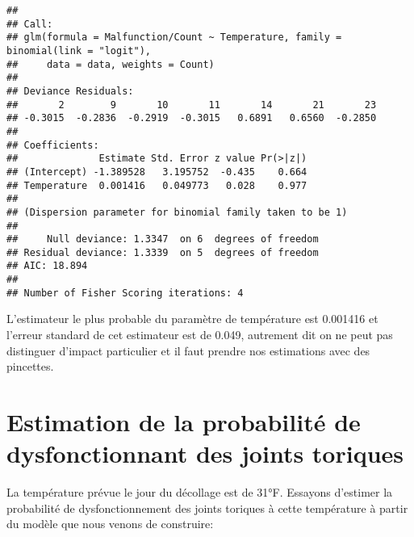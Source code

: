 \documentclass[]{article}
\newenvironment{Shaded}{\begin{snugshade}}{\end{snugshade}}
\newcommand{\CommentTok}[1]{\textcolor[rgb]{0.56,0.35,0.01}{\textit{#1}}}
\newcommand{\DataTypeTok}[1]{\textcolor[rgb]{0.13,0.29,0.53}{#1}}
\newcommand{\DecValTok}[1]{\textcolor[rgb]{0.00,0.00,0.81}{#1}}
\newcommand{\FloatTok}[1]{\textcolor[rgb]{0.00,0.00,0.81}{#1}}
\newcommand{\KeywordTok}[1]{\textcolor[rgb]{0.13,0.29,0.53}{\textbf{#1}}}
\newcommand{\NormalTok}[1]{#1}
\newcommand{\OperatorTok}[1]{\textcolor[rgb]{0.81,0.36,0.00}{\textbf{#1}}}
\newcommand{\StringTok}[1]{\textcolor[rgb]{0.31,0.60,0.02}{#1}}
\begin{document}
\begin{verbatim}
## 
## Call:
## glm(formula = Malfunction/Count ~ Temperature, family = binomial(link = "logit"), 
##     data = data, weights = Count)
## 
## Deviance Residuals: 
##       2        9       10       11       14       21       23  
## -0.3015  -0.2836  -0.2919  -0.3015   0.6891   0.6560  -0.2850  
## 
## Coefficients:
##              Estimate Std. Error z value Pr(>|z|)
## (Intercept) -1.389528   3.195752  -0.435    0.664
## Temperature  0.001416   0.049773   0.028    0.977
## 
## (Dispersion parameter for binomial family taken to be 1)
## 
##     Null deviance: 1.3347  on 6  degrees of freedom
## Residual deviance: 1.3339  on 5  degrees of freedom
## AIC: 18.894
## 
## Number of Fisher Scoring iterations: 4
\end{verbatim}

L'estimateur le plus probable du paramètre de température est 0.001416
et l'erreur standard de cet estimateur est de 0.049, autrement dit on ne
peut pas distinguer d'impact particulier et il faut prendre nos
estimations avec des pincettes.

\hypertarget{estimation-de-la-probabilite-de-dysfonctionnant-des-joints-toriques}{%
\section{Estimation de la probabilité de dysfonctionnant des joints
toriques}\label{estimation-de-la-probabilite-de-dysfonctionnant-des-joints-toriques}}

La température prévue le jour du décollage est de 31°F. Essayons
d'estimer la probabilité de dysfonctionnement des joints toriques à
cette température à partir du modèle que nous venons de construire:

\begin{Shaded}
\end{Shaded}
\end{document}
